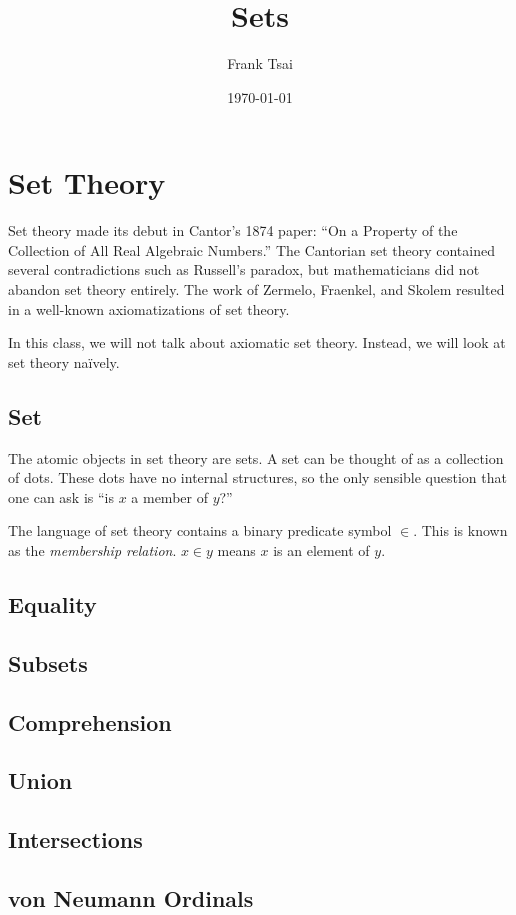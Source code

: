 \documentclass{amsart}
\title{Sets}
\author{Frank Tsai}
\date{\today}
\begin{document}
\maketitle
\tableofcontents

\section{Set Theory}
\label{sec:basic-set-theory}

Set theory made its debut in Cantor's 1874 paper: ``On a Property of the Collection of All Real Algebraic Numbers.''
The Cantorian set theory contained several contradictions such as Russell's paradox, but mathematicians did not abandon set theory entirely.
The work of Zermelo, Fraenkel, and Skolem resulted in a well-known axiomatizations of set theory.

In this class, we will not talk about axiomatic set theory.
Instead, we will look at set theory na\"ively.

\subsection{Set}
\label{sec:set}

The atomic objects in set theory are sets.
A set can be thought of as a collection of dots.
These dots have no internal structures, so the only sensible question that one can ask is ``is $x$ a member of $y$?''

\begin{center}
  
\end{center}

The language of set theory contains a binary predicate symbol $\in$.
This is known as the \emph{membership relation}.
$x \in y$ means $x$ is an element of $y$.

\subsection{Equality}
\label{sec:equality}

\subsection{Subsets}
\label{sec:subsets}

\subsection{Comprehension}
\label{sec:comprehension}

\subsection{Union}
\label{sec:union}

\subsection{Intersections}
\label{sec:intersections}

\subsection{von Neumann Ordinals}
\label{sec:von-neumann-ordinals}
\end{document}

